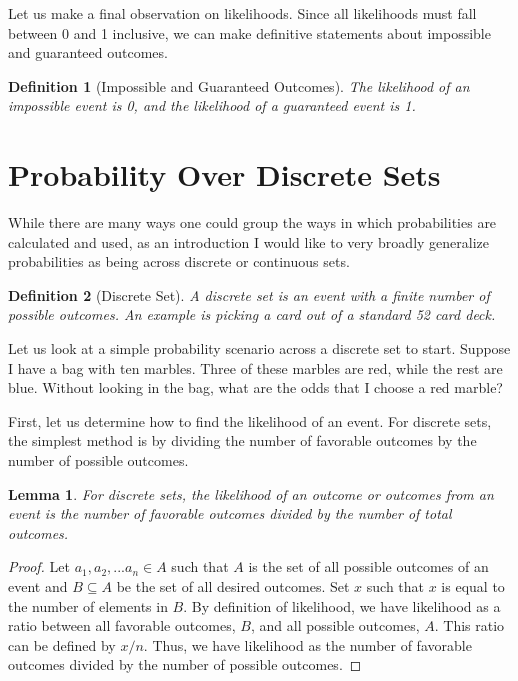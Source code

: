 \documentclass{article}
\newtheorem{definition}{Definition}[section]
\newtheorem{lemma}[theorem]{Lemma}
\begin{document}
Let us make a final observation on likelihoods. Since all likelihoods must fall between 0 and 1 inclusive, we can make definitive statements about impossible and guaranteed outcomes.

\begin{definition}[Impossible and Guaranteed Outcomes]
    The likelihood of an impossible event is 0, and the likelihood of a guaranteed event is 1.
\end{definition}

\section{Probability Over Discrete Sets}

While there are many ways one could group the ways in which probabilities are calculated and used, as an introduction I would like to very broadly generalize probabilities as being across discrete or continuous sets.

\begin{definition}[Discrete Set]
    A discrete set is an event with a finite number of possible outcomes. An example is picking a card out of a standard 52 card deck.
\end{definition}

Let us look at a simple probability scenario across a discrete set to start. Suppose I have a bag with ten marbles. Three of these marbles are red, while the rest are blue. Without looking in the bag, what are the odds that I choose a red marble?

First, let us determine how to find the likelihood of an event. For discrete sets, the simplest method is by dividing the number of favorable outcomes by the number of possible outcomes.

\begin{lemma}
For discrete sets, the likelihood of an outcome or outcomes from an event is the number of favorable outcomes divided by the number of total outcomes. 
\end{lemma}

\begin{proof}
Let $a_1, a_2, ...a_n\in A$ such that $A$ is the set of all possible outcomes of an event and $B\subseteq A$ be the set of all desired outcomes. Set $x$ such that $x$ is equal to the number of elements in $B$. By definition of likelihood, we have likelihood as a ratio between all favorable outcomes, $B$, and all possible outcomes, $A$. This ratio can be defined by $x/n$. Thus, we have likelihood as the number of favorable outcomes divided by the number of possible outcomes.
\end{proof}
\end{document}
